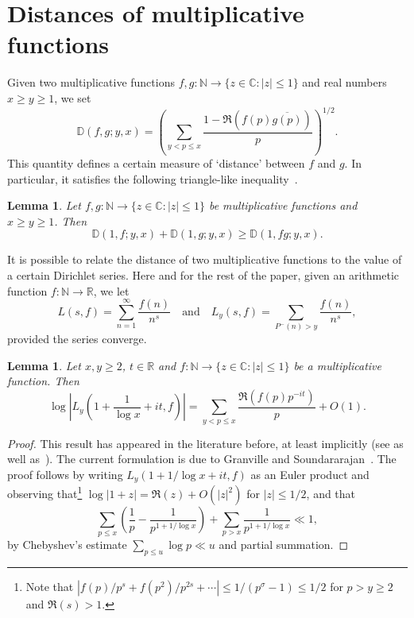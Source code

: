 \documentclass[12pt]{amsart}
\newtheorem{lemma}[theorem]{Lemma}
\theoremstyle{remark}
\newcommand {\SN} {{\mathbb N}}
\newcommand {\SR} {{\mathbb R}}
\newcommand {\SC} {{\mathbb C}}
\newcommand {\SD} {{\mathbb D}}
\newcommand{\be}{\begin{equation}}
\newcommand{\ee}{\end{equation}}
\numberwithin{equation}{section}
\begin{document}


\section{Distances of multiplicative functions}\label{dist}

Given two multiplicative functions $f,g:\SN\to\{z\in\SC:|z|\le1\}$ and real numbers $x\ge y\ge1$, we set $$\SD(f,g;y,x)=\left(\sum_{y<p\le x}\frac{1-\Re(f(p)\overline{g(p)})}p\right)^{1/2}.$$ This quantity defines a certain measure of `distance' between $f$ and $g$. In particular, it satisfies the following triangle-like inequality~\cite[p. 207]{gs2}.

\begin{lemma}\label{triangle}Let $f,g:\SN\to\{z\in\SC:|z|\le1\}$ be multiplicative functions and $x\ge y\ge1$. Then 
$$
\SD(1,f;y,x)+\SD(1,g;y,x)\ge\SD(1,fg;y,x).
$$
\end{lemma}

It is possible to relate the distance of two multiplicative functions to the value of a certain Dirichlet series. Here and for the rest of the paper, given an arithmetic function $f:\SN\to\SR$, we let $$L(s,f)=\sum_{n=1}^\infty\frac{f(n)}{n^s}\quad\text{and}\quad L_y(s,f)=\sum_{P^-(n)>y}\frac{f(n)}{n^s},$$ provided the series converge.

\begin{lemma}\label{l1} Let $x,y\ge2$, $t\in\SR$ and $f:\SN\to\{z\in\SC:|z|\le1\}$ be a multiplicative function. Then 
$$
\log\left|L_y\left(1+\frac1{\log x}+it,f\right)\right|=\sum_{y<p\le x}\frac{\Re(f(p)p^{-it})}{p}+O(1).
$$
\end{lemma}

\begin{proof} This result has appeared in the literature before, at least implicitly (see \cite[Lemma 6.6 in p. 230, and p. 253]{el1} as well as~\cite[p. 459-460]{ten}). The current formulation is due to Granville and Soundararajan~\cite{gs}. The proof follows by writing $L_y(1+1/\log x+it,f)$ as an Euler product and observing that\footnote{Note that $|f(p)/p^s+f(p^2)/p^{2s}+\cdots|\le1/(p^\sigma-1)\le1/2$ for $p>y\ge2$ and $\Re(s)>1$.}
$\log|1+z|=\Re(z)+O(|z|^2)$ for $|z|\le1/2$, and that
\be\label{dist e2}
\sum_{p\le x}\left(\frac1p-\frac1{p^{1+1/\log x}}\right)+ \sum_{p>x} \frac1{p^{1+1/\log x}} \ll1,
\ee
by Chebyshev's estimate $\sum_{p\le u}\log p\ll u$ and partial summation.
\end{proof}
\end{document}
